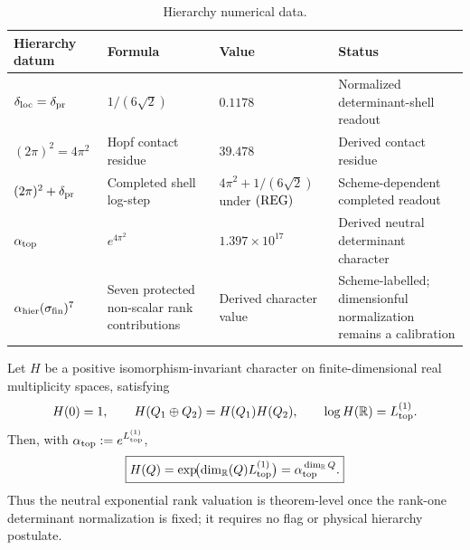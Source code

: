 \documentclass[12pt,a4paper]{article}
\begin{document}
\begin{table}[H]
\centering
\small
\begingroup
\setlength{\tabcolsep}{3pt}
\renewcommand{\arraystretch}{1.15}
\begin{tabular}{@{}
  L{2.0cm}
  L{4.0cm}
  L{3.2cm}
  L{\dimexpr\linewidth-9.2cm-6\tabcolsep\relax}
@{}}
\toprule
\textbf{Hierarchy datum}
& \textbf{Formula}
& \textbf{Value}
& \textbf{Status} \\
\midrule

\(\delta_{\rm loc}=\delta_{\rm pr}\)
& \(1/(6\sqrt{2})\)
& \(0.1178\)
& Normalized determinant-shell readout \\

\((2\pi)^2=4\pi^2\)
& Hopf contact residue
& \(39.478\)
& Derived contact residue \\

\((2\pi)^2+\delta_{\rm pr}\)
& Completed shell log-step
& \(4\pi^2+1/(6\sqrt2)\) under \(({\rm REG})\)
& Scheme-dependent completed readout \\

\(\alpha_{\rm top}\)
& \(e^{4\pi^2}\)
& \(1.397\times 10^{17}\)
& Derived neutral determinant character \\

\(\alpha_{\rm hier}(\sigma_{\rm fin})^7\)
& Seven protected non-scalar rank contributions
& Derived character value
& Scheme-labelled; dimensionful normalization remains a calibration \\

\bottomrule
\end{tabular}
\caption[Hierarchy numerical data]{Hierarchy numerical data.}
\label{tab:p3-hierarchy-data}
\endgroup
\end{table}

\begin{theorem}
\label{p3:thm:determinant-rank-character}
Let \(H\) be a positive isomorphism-invariant character on finite-dimensional
real multiplicity spaces, satisfying
\[
 H(0)=1,\qquad H(Q_1\oplus Q_2)=H(Q_1)H(Q_2),\qquad
 \log H(\mathbb R)=L_{\rm top}^{(1)}.
\]
Then, with \(\alpha_{\rm top}:=e^{L_{\rm top}^{(1)}}\),
\begin{equation}
\label{p3:eq:HT-rank-valuation}
 \boxed{H(Q)=
 \exp\!\bigl(\dim_{\mathbb R}(Q)L_{\rm top}^{(1)}\bigr)
 =\alpha_{\rm top}^{\,\dim_{\mathbb R}Q}.}
\end{equation}
Thus the neutral exponential rank valuation is theorem-level once the
rank-one determinant normalization is fixed; it requires no flag or physical
hierarchy postulate.
\end{theorem}
\end{document}
